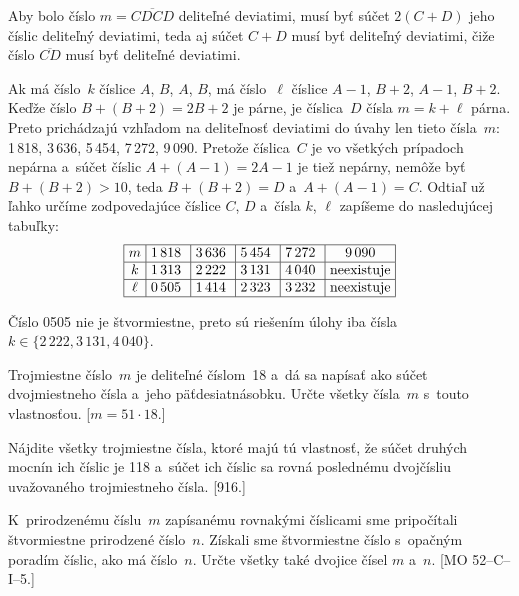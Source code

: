 {%
Aby bolo číslo $m=\overline{CDCD}$ deliteľné deviatimi, musí byť
súčet $2(C+D)$ jeho číslic deliteľný deviatimi, teda aj súčet
$C+D$ musí byť deliteľný deviatimi, čiže číslo $\overline{CD}$
musí byť deliteľné deviatimi.

Ak má číslo~$k$ číslice $A$, $B$, $A$, $B$, má číslo~$\ell$ číslice
$A-1$, $B+2$, $A-1$, $B+2$. Keďže číslo $B+(B+2)=2B+2$ je párne,
je číslica~$D$ čísla $m=k+\ell$ párna. Preto prichádzajú vzhľadom 
na deliteľnosť deviatimi do úvahy len tieto čísla~$m$: 1\,818, 3\,636, 5\,454,
7\,272, 9\,090. Pretože číslica~$C$ je vo všetkých prípadoch nepárna 
a~súčet číslic $A+(A-1)=2A-1$ je tiež nepárny, nemôže byť
$B+(B+2)>10$, teda $B+(B+2)=D$ a~$A+(A-1)=C$. Odtiaľ už ľahko
určíme zodpovedajúce číslice $C$, $D$ a~čísla $k$, $\ell$ zapíšeme
do nasledujúcej tabuľky:
$$
\vbox{\let\par\cr\offinterlineskip
\everycr{\noalign{\hrule}}
\halign{\vrule#\strut&\ \hss$#$ \hss\vrule&&\ \hss# \hss\vrule\cr
&m &1\,818 &3\,636 &5\,454 &7\,272 &9\,090\cr
&k &1\,313 &2\,222 &3\,131 &4\,040 &neexistuje\cr
&\ell &0\,505 &1\,414 &2\,323 &3\,232 &neexistuje\cr
}}
$$

Číslo 0505 nie je štvormiestne, preto sú riešením úlohy iba
čísla $k\in\{2\,222,3\,131,\allowbreak 4\,040\}$.


Trojmiestne číslo~$m$ je deliteľné číslom~18 a~dá sa napísať ako
súčet dvojmiestneho čísla a~jeho päťdesiatnásobku. Určte všetky
čísla~$m$ s~touto vlastnosťou. [$m=51\cdot18$.]

Nájdite všetky trojmiestne čísla, ktoré majú tú vlastnosť, že
súčet druhých mocnín ich číslic je 118 a~súčet ich číslic
sa rovná poslednému dvojčísliu uvažovaného trojmiestneho čísla.
[916.]

K~prirodzenému číslu~$m$ zapísanému rovnakými číslicami sme pripočítali
štvormiestne prirodzené číslo~$n$. Získali sme štvormiestne číslo
s~opačným poradím číslic, ako má číslo~$n$. Určte všetky také
dvojice čísel $m$ a~$n$. [MO 52--C--I--5.]
}

